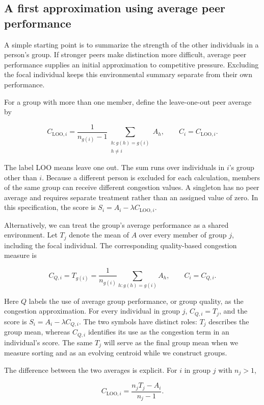 \subsection{A first approximation using average peer performance}\label{a-first-approximation-using-average-peer-performance}

A simple starting point is to summarize the strength of the other individuals in a person's group. If stronger peers make distinction more difficult, average peer performance supplies an initial approximation to competitive pressure. Excluding the focal individual keeps this environmental summary separate from their own performance.

For a group with more than one member, define the leave-one-out peer average by

\[
C_{\mathrm{LOO},i}
=\frac{1}{n_{g(i)}-1}
\sum_{\substack{h:g(h)=g(i)\\h\ne i}} A_h,
\qquad C_i=C_{\mathrm{LOO},i}.
\]

The label LOO means leave one out. The sum runs over individuals in \(i\)'s group other than \(i\). Because a different person is excluded for each calculation, members of the same group can receive different congestion values. A singleton has no peer average and requires separate treatment rather than an assigned value of zero. In this specification, the score is \(S_i=A_i-\lambda C_{\mathrm{LOO},i}\).

Alternatively, we can treat the group's average performance as a shared environment. Let \(T_j\) denote the mean of \(A\) over every member of group \(j\), including the focal individual. The corresponding quality-based congestion measure is

\[
C_{Q,i}=T_{g(i)}
=\frac{1}{n_{g(i)}}\sum_{h:g(h)=g(i)}A_h,
\qquad C_i=C_{Q,i}.
\]

Here \(Q\) labels the use of average group performance, or group quality, as the congestion approximation. For every individual in group \(j\), \(C_{Q,i}=T_j\), and the score is \(S_i=A_i-\lambda C_{Q,i}\). The two symbols have distinct roles: \(T_j\) describes the group mean, whereas \(C_{Q,i}\) identifies its use as the congestion term in an individual's score. The same \(T_j\) will serve as the final group mean when we measure sorting and as an evolving centroid while we construct groups.

The difference between the two averages is explicit. For \(i\) in group \(j\) with \(n_j>1\),

\[
C_{\mathrm{LOO},i}=\frac{n_jT_j-A_i}{n_j-1}.
\]


